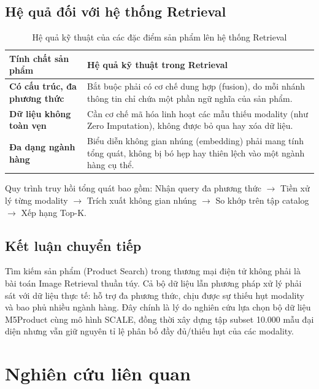 \documentclass[10pt,conference]{IEEEtran}
\begin{document}
\subsection{Hệ quả đối với hệ thống Retrieval}

\begin{table}[htbp]
\centering
\caption{Hệ quả kỹ thuật của các đặc điểm sản phẩm lên hệ thống Retrieval}
\label{tab:dieu_kien_retrieval}
\small
\begin{tabular}{L{2.5cm}L{5.0cm}}
\toprule
\textbf{Tính chất sản phẩm} & \textbf{Hệ quả kỹ thuật trong Retrieval} \\
\midrule
\textbf{Có cấu trúc, đa phương thức} & Bắt buộc phải có cơ chế dung hợp (fusion), do mỗi nhánh thông tin chỉ chứa một phần ngữ nghĩa của sản phẩm. \\
\midrule
\textbf{Dữ liệu không toàn vẹn} & Cần cơ chế mã hóa linh hoạt các mẫu thiếu modality (như Zero Imputation), không được bỏ qua hay xóa dữ liệu. \\
\midrule
\textbf{Đa dạng ngành hàng} & Biểu diễn không gian nhúng (embedding) phải mang tính tổng quát, không bị bó hẹp hay thiên lệch vào một ngành hàng cụ thể. \\
\bottomrule
\end{tabular}
\end{table}

Quy trình truy hồi tổng quát bao gồm: Nhận query đa phương thức $\rightarrow$ Tiền xử lý từng modality $\rightarrow$ Trích xuất không gian nhúng $\rightarrow$ So khớp trên tập catalog $\rightarrow$ Xếp hạng Top-K.

\subsection{Kết luận chuyển tiếp}
Tìm kiếm sản phẩm (Product Search) trong thương mại điện tử không phải là bài toán Image Retrieval thuần túy. Cả bộ dữ liệu lẫn phương pháp xử lý phải sát với dữ liệu thực tế: hỗ trợ đa phương thức, chịu được sự thiếu hụt modality và bao phủ nhiều ngành hàng. Đây chính là lý do nghiên cứu lựa chọn bộ dữ liệu M5Product cùng mô hình SCALE, đồng thời xây dựng tập subset 10.000 mẫu đại diện nhưng vẫn giữ nguyên tỉ lệ phân bố đầy đủ/thiếu hụt của các modality.

\section{Nghiên cứu liên quan}
\end{document}

